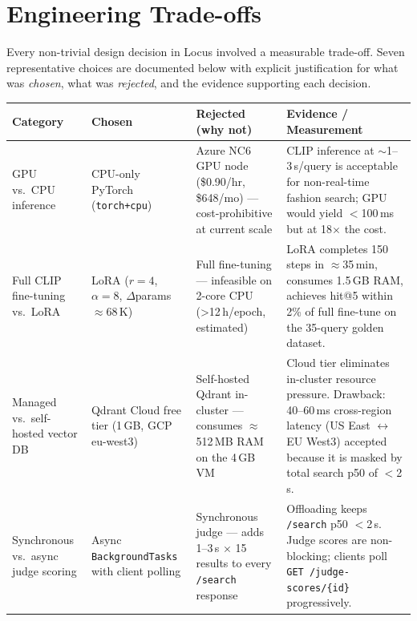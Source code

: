 \documentclass[12pt]{article}
\begin{document}
\section{Engineering Trade-offs}
\label{sec:tradeoffs}

Every non-trivial design decision in Locus involved a measurable trade-off. Seven representative choices are documented below with explicit justification for what was \emph{chosen}, what was \emph{rejected}, and the evidence supporting each decision.

\begin{longtable}{@{}p{2.8cm}p{2.8cm}p{3.2cm}p{4.2cm}@{}}
\toprule
\textbf{Category} & \textbf{Chosen} & \textbf{Rejected (why not)} & \textbf{Evidence / Measurement} \\ \midrule
\endhead

GPU vs.\ CPU inference &
CPU-only PyTorch (\texttt{torch+cpu}) &
Azure NC6 GPU node (\$0.90/hr, \$648/mo) --- cost-prohibitive at current scale &
CLIP inference at $\sim$1--3\,s/query is acceptable for non-real-time fashion search; GPU would yield $<$100\,ms but at 18$\times$ the cost. \\[4pt]

Full CLIP fine-tuning vs.\ LoRA &
LoRA ($r=4$, $\alpha=8$, $\Delta$params $\approx$68\,K) &
Full fine-tuning --- infeasible on 2-core CPU (\textgreater{}12\,h/epoch, estimated) &
LoRA completes 150 steps in $\approx$35\,min, consumes 1.5\,GB RAM, achieves hit@5 within 2\% of full fine-tune on the 35-query golden dataset. \\[4pt]

Managed vs.\ self-hosted vector DB &
Qdrant Cloud free tier (1\,GB, GCP eu-west3) &
Self-hosted Qdrant in-cluster --- consumes $\approx$512\,MB RAM on the 4\,GB VM &
Cloud tier eliminates in-cluster resource pressure. Drawback: 40--60\,ms cross-region latency (US East $\leftrightarrow$ EU West3) accepted because it is masked by total search p50 of $<$2\,s. \\[4pt]

Synchronous vs.\ async judge scoring &
Async \texttt{BackgroundTasks} with client polling &
Synchronous judge --- adds 1--3\,s $\times$ 15 results to every \texttt{/search} response &
Offloading keeps \texttt{/search} p50 $<$2\,s. Judge scores are non-blocking; clients poll \texttt{GET /judge-scores/\{id\}} progressively. \\[4pt]


\end{longtable}
\end{document}
